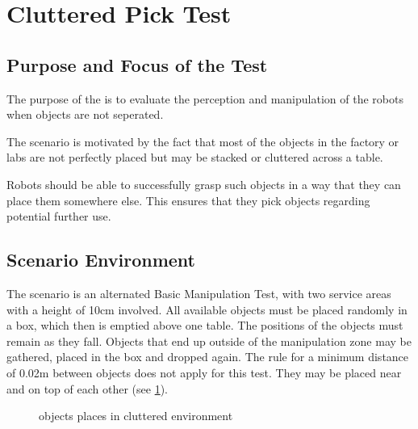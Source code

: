 \newpage
\section{Cluttered Pick Test}

\subsection{Purpose and Focus of the Test}

The purpose of the  is to evaluate the perception
and manipulation of the robots when objects are not seperated.

The scenario is motivated by the fact that most of the objects in the factory or 
labs are not perfectly placed but may be stacked or cluttered across a table.

Robots should be able to successfully grasp such objects in a way that they can place them somewhere else.
This ensures that they pick objects regarding potential further use.

\subsection{Scenario Environment}

The scenario is an alternated Basic Manipulation Test, with two service areas with a height of 10cm involved.
All available objects must be placed randomly in a box, which then is emptied above one table. The positions of the objects must remain as they fall. Objects that end up outside of the manipulation zone may be gathered, placed in the box and dropped again. The rule for a minimum distance of 0.02m between objects does not apply for this test. They may be placed near and on top of each other (see \ref{fig:clutter}).

\begin{figure} [h!]
\begin{center}
 \hspace{1cm}
\end{center}
\caption{objects places in cluttered environment}
\label{fig:clutter}
\end{figure} 


